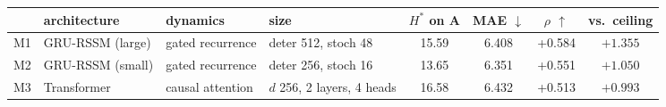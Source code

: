 \begin{tabular}{llllcccc}
\toprule
& architecture & dynamics & size & $H^*$ on A & MAE $\downarrow$ & $\rho$ $\uparrow$ & vs.\ ceiling \\
\midrule
M1 & GRU-RSSM (large) & gated recurrence & deter 512, stoch 48 & 15.59 & 6.408 & +0.584 & $+1.355$ \\
M2 & GRU-RSSM (small) & gated recurrence & deter 256, stoch 16 & 13.65 & 6.351 & +0.551 & $+1.050$ \\
M3 & Transformer & causal attention & $d$ 256, 2 layers, 4 heads & 16.58 & 6.432 & +0.513 & $+0.993$ \\
\bottomrule
\end{tabular}